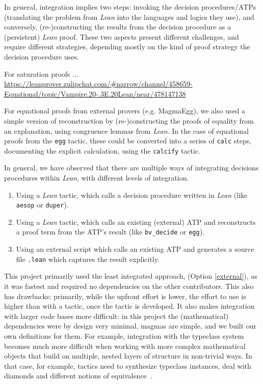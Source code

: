 In general, integration implies two steps: invoking the decision procedures/ATPs (translating the problem from \emph{Lean} into the languages and logics they use), and conversely, (re-)constructing the results from the decision procedure as a (persistent) \emph{Lean} proof.
These two aspects present different challenges, and require different strategies, depending mostly on the kind of proof strategy the decision procedure uses.

For saturation proofs $\ldots$
\url{https://leanprover.zulipchat.com/#narrow/channel/458659-Equational/topic/Vampire.20-.3E.20Lean/near/478147138}

For equational proofs from external provers (e.g. MagmaEgg), we also used a simple version of reconstruction by (re-)constructing the proofs of equality from an explanation, using congruence lemmas from \emph{Lean}.
In the case of equational proofs from the \texttt{egg} tactic, these could be converted into a series of \texttt{calc} steps, documenting the explicit calculation, using the \texttt{calcify} tactic.

In general, we have observed that there are multiple ways of integrating decisions procedures within \emph{Lean}, with different levels of integration.
\begin{enumerate}
    \item Using a \emph{Lean} tactic, which calls a decision procedure written in \emph{Lean} (like \texttt{aesop} or \texttt{duper}).
    \item Using a \emph{Lean} tactic, which calls an existing (external) ATP and reconstructs a proof term from the ATP's result (like \texttt{bv\_decide} or \texttt{egg}).
    \item\label{external} Using an external script which calls an existing ATP and generates a source file \texttt{.lean} which captures the result explicitly.
\end{enumerate}

This project primarily used the least integrated approach, (Option \ref{external}), as it was fastest and required no dependencies on the other contributors.
This also has drawbacks: primarily, while the upfront effort is lower, the effort to use is higher than with a tactic, once the tactic is developed.
It also makes integration with larger code bases more difficult: in this project the (mathematical) dependencies were by design very minimal, magmas are simple, and we built our own definitions for them.
For example, integration with the typeclass system becomes much more difficult when working with more complex mathematical objects that build on multiple, nested layers of structure in non-trivial ways.
In that case, for example, tactics need to synthesize typeclass instances, deal with diamonds and different notions of equivalence~\cite{DBLP:conf/mkm/Wieser23}.

